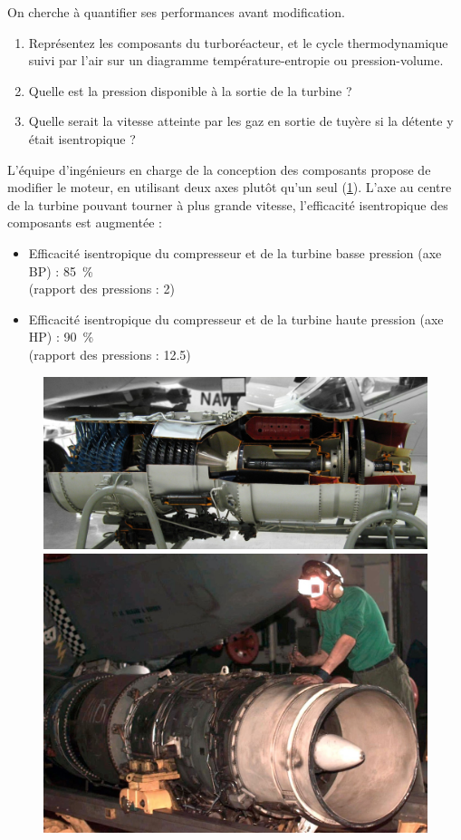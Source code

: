 	On cherche à quantifier ses performances avant modification.
		\begin{enumerate}
			\item Représentez les composants du turboréacteur, et le cycle thermodynamique suivi par l’air sur un diagramme température-entropie ou pression-volume.
			\item Quelle est la pression disponible à la sortie de la turbine ?
			\item Quelle serait la vitesse atteinte par les gaz en sortie de tuyère si la détente y était isentropique ?
		\end{enumerate}
		
		L’équipe d’ingénieurs en charge de la conception des composants propose de modifier le moteur, en utilisant deux axes plutôt qu’un seul (\cref{fig_exo_turbojet_twin_spool}). L’axe au centre de la turbine pouvant tourner à plus grande vitesse, l’efficacité isentropique des composants est augmentée :
			\begin{itemize}
				\item Efficacité isentropique du compresseur et de la turbine basse pression (axe BP) : \SI{85}{\percent}\\
					(rapport des pressions : \num{2})
				\item Efficacité isentropique du compresseur et de la turbine haute pression (axe HP) : \SI{90}{\percent}\\
					(rapport des pressions : \num{12,5})
			\end{itemize}
	
	\begin{figure}
		\begin{center}
			\includegraphics[height=0.27\textwidth]{images/photo_pw_j52_1.jpg}
			\includegraphics[height=0.27\textwidth]{images/photo_pw_j52_2.jpg}
		\end{center}
		\label{fig_exo_turbojet_twin_spool}
	\end{figure}
			
